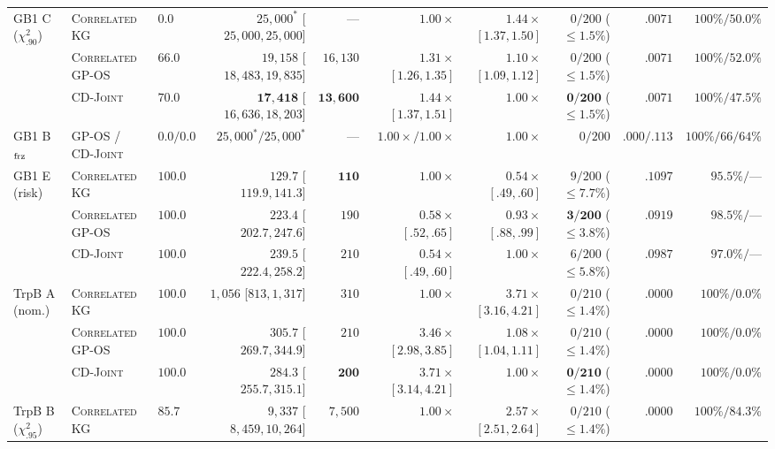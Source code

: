 \documentclass{article}
\theoremstyle{plain}
\theoremstyle{definition}
\begin{document}
\begin{table}[!htbp]
{\begin{tabular}{@{}lllrrrrrrr@{}}
\midrule
\multirow{3}{*}{GB1 C ($\chi^2_{.90}$)}
 & \textsc{Correlated KG} & $0.0$ & $25{,}000^*$ [$25{,}000,25{,}000$] & --- & $1.00\times$ & $1.44\times$ $[1.37,1.50]$ & $0/200$ ($\le 1.5\%$) & $.0071$ & $100\% / 50.0\%$ \\
 & \textsc{Correlated GP-OS} & $66.0$ & $19{,}158$ [$18{,}483,19{,}835$] & $16{,}130$ & $1.31\times$ $[1.26,1.35]$ & $1.10\times$ $[1.09,1.12]$ & $0/200$ ($\le 1.5\%$) & $.0071$ & $100\% / 52.0\%$ \\
 & \textsc{CD-Joint} & $\mathbf{70.0}$ & $\mathbf{17{,}418}$ [$16{,}636,18{,}203$] & $\mathbf{13{,}600}$ & $\mathbf{1.44\times}$ $[1.37,1.51]$ & $1.00\times$ & $\mathbf{0/200}$ ($\le 1.5\%$) & $.0071$ & $100\% / 47.5\%$ \\
\midrule
GB1 B$_{\rm frz}$ & \textsc{GP-OS} / \textsc{CD-Joint} & $0.0 / 0.0$ & $25{,}000^* / 25{,}000^*$ & --- & $1.00\times / 1.00\times$ & $1.00\times$ & $0/200$ & $.000/.113$ & $100\% / 66/64\%$ \\
\midrule
\multirow{3}{*}{GB1 E (risk)}
 & \textsc{Correlated KG} & $\mathbf{100.0}$ & $\mathbf{129.7}$ [$119.9,141.3$] & $\mathbf{110}$ & $1.00\times$ & $0.54\times$ $[.49,.60]$ & $9/200$ ($\le 7.7\%$) & $.1097$ & $95.5\% / \text{---}$ \\
 & \textsc{Correlated GP-OS} & $\mathbf{100.0}$ & $223.4$ [$202.7,247.6$] & $190$ & $0.58\times$ $[.52,.65]$ & $0.93\times$ $[.88,.99]$ & $\mathbf{3/200}$ ($\le 3.8\%$) & $.0919$ & $98.5\% / \text{---}$ \\
 & \textsc{CD-Joint} & $\mathbf{100.0}$ & $239.5$ [$222.4,258.2$] & $210$ & $0.54\times$ $[.49,.60]$ & $1.00\times$ & $6/200$ ($\le 5.8\%$) & $.0987$ & $97.0\% / \text{---}$ \\
\midrule
\midrule
\multirow{3}{*}{TrpB A (nom.)}
 & \textsc{Correlated KG} & $\mathbf{100.0}$ & $1{,}056$ [$813,1{,}317$] & $310$ & $1.00\times$ & $3.71\times$ $[3.16,4.21]$ & $0/210$ ($\le 1.4\%$) & $.0000$ & $100\% / 0.0\%$ \\
 & \textsc{Correlated GP-OS} & $\mathbf{100.0}$ & $305.7$ [$269.7,344.9$] & $210$ & $3.46\times$ $[2.98,3.85]$ & $1.08\times$ $[1.04,1.11]$ & $0/210$ ($\le 1.4\%$) & $.0000$ & $100\% / 0.0\%$ \\
 & \textsc{CD-Joint} & $\mathbf{100.0}$ & $\mathbf{284.3}$ [$255.7,315.1$] & $\mathbf{200}$ & $\mathbf{3.71\times}$ $[3.14,4.21]$ & $1.00\times$ & $\mathbf{0/210}$ ($\le 1.4\%$) & $.0000$ & $100\% / 0.0\%$ \\
\midrule
\multirow{3}{*}{TrpB B ($\chi^2_{.95}$)}
 & \textsc{Correlated KG} & $85.7$ & $9{,}337$ [$8{,}459,10{,}264$] & $7{,}500$ & $1.00\times$ & $2.57\times$ $[2.51,2.64]$ & $0/210$ ($\le 1.4\%$) & $.0000$ & $100\% / 84.3\%$ \\

\end{tabular}}
\end{table}
\end{document}
